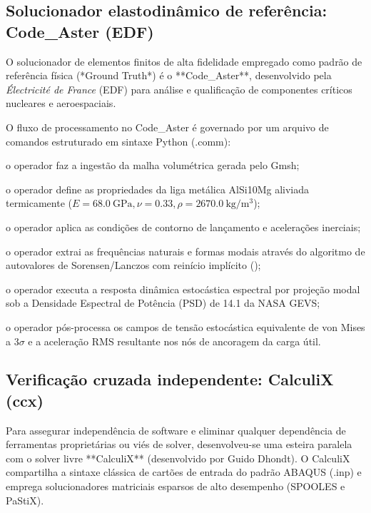 \subsection{Solucionador elastodinâmico de referência: Code\_Aster (EDF)}
\label{subsec:codeaster-stack}

O solucionador de elementos finitos de alta fidelidade empregado como padrão de referência física (*Ground Truth*) é o **Code\_Aster**, desenvolvido pela \textit{Électricité de France} (EDF) para análise e qualificação de componentes críticos nucleares e aeroespaciais. 

O fluxo de processamento no Code\_Aster é governado por um arquivo de comandos estruturado em sintaxe Python (.comm):
\begin{alineas}
  \item o operador  faz a ingestão da malha volumétrica gerada pelo Gmsh;
  \item o operador  define as propriedades da liga metálica AlSi10Mg aliviada termicamente ($E = \SI{68.0}{\giga\pascal}, \nu = \num{0.33}, \rho = \SI{2670.0}{\kilo\gram\per\cubic\metre}$);
  \item o operador  aplica as condições de contorno de lançamento e acelerações inerciais;
  \item o operador  extrai as frequências naturais e formas modais através do algoritmo de autovalores de Sorensen/Lanczos com reinício implícito ();
  \item o operador  executa a resposta dinâmica estocástica espectral por projeção modal sob a Densidade Espectral de Potência (PSD) de \SI{14.1}{\Grms} da NASA GEVS;
  \item o operador  pós-processa os campos de tensão estocástica equivalente de von Mises a $3\sigma$ e a aceleração RMS resultante nos nós de ancoragem da carga útil.
\end{alineas}

\subsection{Verificação cruzada independente: CalculiX (ccx)}
\label{subsec:calculix-stack}

Para assegurar independência de software e eliminar qualquer dependência de ferramentas proprietárias ou viés de solver, desenvolveu-se uma esteira paralela com o solver livre **CalculiX** (desenvolvido por Guido Dhondt). O CalculiX compartilha a sintaxe clássica de cartões de entrada do padrão ABAQUS (.inp) e emprega solucionadores matriciais esparsos de alto desempenho (SPOOLES e PaStiX).

